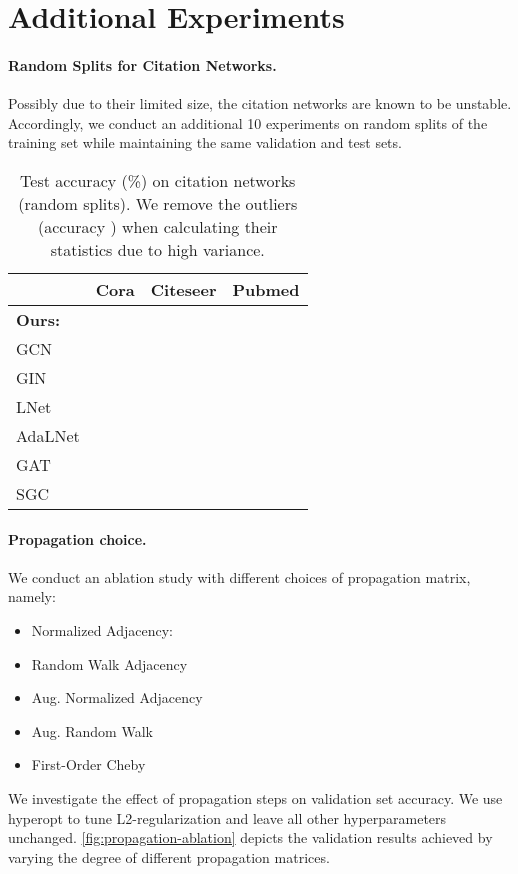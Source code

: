 \documentclass{article}
\newcommand{\method}{SGC}
\begin{document}
\section{Additional Experiments}
\paragraph{Random Splits for Citation Networks.}
Possibly due to their limited size, the citation networks are known to be unstable. 
Accordingly, we conduct an additional 10 experiments on random splits of the training set while maintaining the same validation and test sets. 
\begin{table}[th!]
\small
\centering
\caption{Test accuracy (\%) on citation networks (random splits). We remove the outliers (accuracy ) when calculating their statistics due to high variance.}
\label{table:citation-random}
\begin{tabular}{l|c|c|c}
\toprule
 & Cora & Citeseer & Pubmed \\ 
\midrule
\multicolumn{4}{l}{\textbf{Ours:}} \\
GCN &   &  & \\
GIN  &  &  &  \\
LNet &  &  &  \\
AdaLNet &  &  &  \\
GAT  &  &   &  \\
{\color{modelblue} \method{}} &  &  & \\
 \bottomrule
\end{tabular}
\end{table}
\paragraph{Propagation choice.}
We conduct an ablation study with different choices of propagation matrix, namely:
\begin{itemize}
\item[] Normalized Adjacency: 
\item[] Random Walk Adjacency 
\item[] Aug. Normalized Adjacency  \item[] Aug. Random Walk  
\item[] First-Order Cheby 
\end{itemize}

We investigate the effect of propagation steps  on validation set accuracy. 
We use hyperopt to tune L2-regularization and leave all other hyperparameters unchanged. \autoref{fig:propagation-ablation} depicts the validation results achieved by varying the degree of different propagation matrices.
\end{document}
